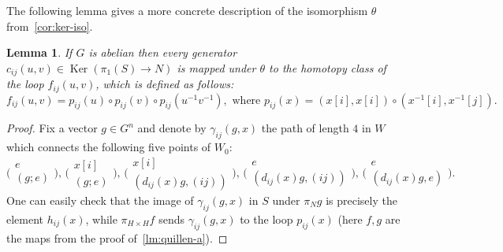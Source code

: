 \documentclass[oneside, 10pt]{amsart}
\theoremstyle{plain}
\numberwithin{equation}{section}
\newtheorem{lemma}{Lemma}
\numberwithin{lemma}{section}
\theoremstyle{remark}
\theoremstyle{definition}
\DeclareMathOperator{\Ker}{Ker}
\begin{document}
The following lemma gives a more concrete description of the isomorphism $\theta$ from~\cref{cor:ker-iso}.
\begin{lemma} \label{lem:concrete-formula}
 If $G$ is abelian then every generator $c_{ij}(u, v) \in \Ker(\pi_1(S)\to N)$ is mapped under $\theta$ to the homotopy class of the loop $f_{ij}(u, v)$, 
  which is defined as follows:
 \[f_{ij}(u,v) = p_{ij}(u) \circ p_{ij}(v) \circ p_{ij}(u^{-1} v^{-1}), \text{ where }
   p_{ij}(x)=(x[i], x[i]) \circ (x^{-1}[i], x^{-1}[j]).\] 
\end{lemma}
\begin{proof}
Fix a vector $g\in G^n$ and denote by $\gamma_{ij}(g, x)$ the path of length $4$ in $W$ which connects 
the following five points of $W_0$:
\[
\Big(\begin{smallmatrix} e    \\ (g; e) \end{smallmatrix}\Big),\,
\Big(\begin{smallmatrix} x[i] \\ (g; e) \end{smallmatrix}\Big),\,
\Big(\begin{smallmatrix} x[i] \\ (d_{ij}(x) g, (ij)) \end{smallmatrix}\Big),\,
\Big(\begin{smallmatrix} e    \\ (d_{ij}(x) g, (ij)) \end{smallmatrix}\Big),\,
\Big(\begin{smallmatrix} e    \\ (d_{ij}(x) g, e) \end{smallmatrix}\Big).\]
One can easily check that the image of $\gamma_{ij}(g, x)$ in $S$ under $\pi_N g$ is precisely the element $h_{ij}(x)$, while
$\pi_{H\times H} f$ sends $\gamma_{ij}(g, x)$ to the loop $p_{ij}(x)$ (here $f, g$ are the maps from the proof of~\cref{lm:quillen-a}).
\end{proof}
\end{document}
